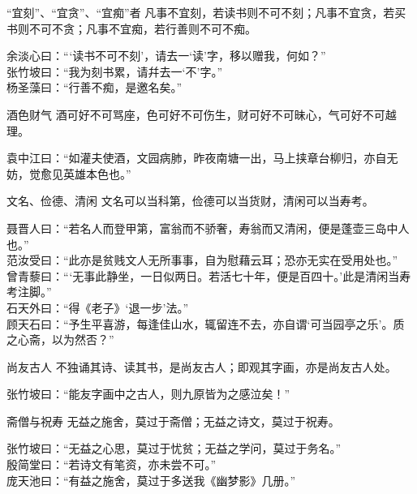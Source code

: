 \begin{yulu}{“宜刻”、“宜贪”、“宜痴”者}
凡事不宜刻，若读书则不可不刻；凡事不宜贪，若买书则不可不贪；凡事不宜痴，若行善则不可不痴。
\begin{comments}
余淡心曰：“‘读书不可不刻’，请去一‘读’字，移以赠我，何如？” \\
张竹坡曰：“我为刻书累，请幷去一‘不’字。” \\
杨圣藻曰：“行善不痴，是邀名矣。”
\end{comments}
\end{yulu}

\begin{yulu}{酒色财气}
酒可好不可骂座，色可好不可伤生，财可好不可昧心，气可好不可越理。
\begin{comments}
袁中江曰：“如灌夫使酒，文园病肺，昨夜南塘一出，马上挟章台柳归，亦自无妨，觉愈见英雄本色也。”
\end{comments}
\end{yulu}

\begin{yulu}{文名、俭德、清闲}
文名可以当科第，俭德可以当货财，清闲可以当寿考。
\begin{comments}
聂晋人曰：“若名人而登甲第，富翁而不骄奢，寿翁而又清闲，便是蓬壶三岛中人也。” \\
范汝受曰：“此亦是贫贱文人无所事事，自为慰藉云耳；恐亦无实在受用处也。” \\
曾青藜曰：“‘无事此静坐，一日似两日。若活七十年，便是百四十。’此是清闲当寿考注脚。” \\
石天外曰：“得《老子》‘退一步’法。” \\
顾天石曰：“予生平喜游，每逢佳山水，辄留连不去，亦自谓‘可当园亭之乐’。质之心斋，以为然否？”
\end{comments}
\end{yulu}

\begin{yulu}{尚友古人}
不独诵其诗、读其书，是尚友古人；即观其字画，亦是尚友古人处。
\begin{comments}
张竹坡曰：“能友字画中之古人，则九原皆为之感泣矣！”
\end{comments}
\end{yulu}

\begin{yulu}{斋僧与祝寿}
无益之施舍，莫过于斋僧；无益之诗文，莫过于祝寿。
\begin{comments}
张竹坡曰：“无益之心思，莫过于忧贫；无益之学问，莫过于务名。” \\
殷简堂曰：“若诗文有笔资，亦未尝不可。” \\
庞天池曰：“有益之施舍，莫过于多送我《幽梦影》几册。”
\end{comments}
\end{yulu}

